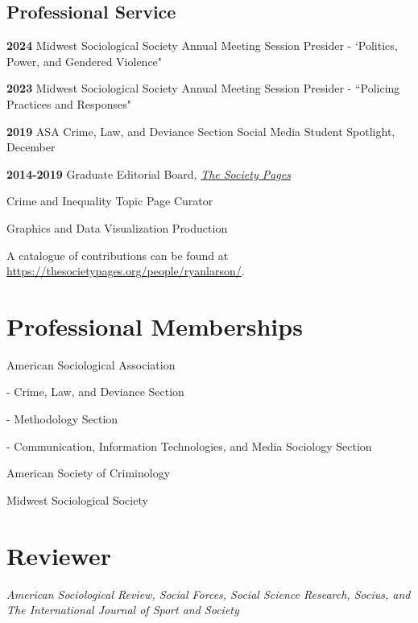 \documentclass[letterpaper]{article}
\newenvironment{publist}{%
  \begin{list}{}{%
    \setlength{\leftmargin}{0cm}   %
    \setlength{\labelwidth}{2cm}     %
    \setlength{\labelsep}{0.5cm}     %
  }%
}{%
  \end{list}%
}
\renewenvironment{itemize}{
  \begin{list}{}{
    \setlength{\leftmargin}{1.5em}
  }
}{
  \end{list}
}
\begin{document}
\subsection*{Professional Service}

\begin{publist}

\item[\textbf{2024}] Midwest Sociological Society Annual Meeting Session Presider - `Politics, Power, and Gendered Violence"

\item[\textbf{2023}] Midwest Sociological Society Annual Meeting Session Presider - ``Policing Practices and Responses"

\item[\textbf{2019}] ASA Crime, Law, and Deviance Section Social Media Student Spotlight, December

\item[\textbf{2014-2019}]  Graduate Editorial Board, \href{http://thesocietypages.org/}{\textit{The Society Pages}}
\begin{itemize}
\item Crime and Inequality Topic Page Curator
\item Graphics and Data Visualization Production
\item A catalogue of contributions can be found at \href{https://thesocietypages.org/people/ryanlarson/}{https://thesocietypages.org/people/ryanlarson/}.
\end{itemize}

\end{publist}


\section*{\textbf{Professional Memberships}}
\begin{publist}

\item American Sociological Association
\begin{itemize}
\item - Crime, Law, and Deviance Section
\item - Methodology Section
\item - Communication, Information Technologies, and Media Sociology Section
\end{itemize}
\item American Society of Criminology
\item Midwest Sociological Society

\end{publist}

\section*{\textbf{Reviewer}}

\textit{American Sociological Review, Social Forces, Social Science Research, Socius, and The International Journal of Sport and Society}
\end{document}
